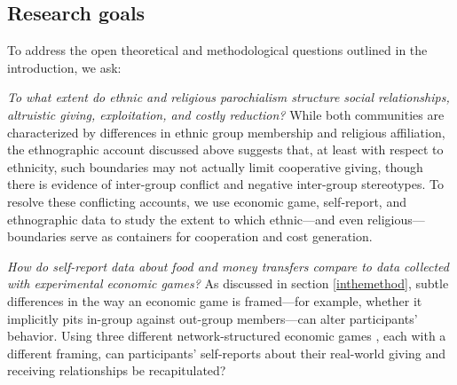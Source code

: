 \documentclass[bibauthoryear]{aa}
\begin{document}
\subsection{Research goals}
To address the open theoretical and methodological questions outlined in the introduction, we ask:\\
\indent
\begin{enumerate*}[label={Q(\arabic*)},font={\color{blue!50!black}\bfseries}]
\item \label{q1} \emph{To what extent do ethnic and religious parochialism structure social relationships, altruistic giving, exploitation, and costly reduction?} While both communities are characterized by differences in ethnic group membership and religious affiliation, the ethnographic account discussed above \citep{Cay73} suggests that, at least with respect to ethnicity, such boundaries may not actually limit cooperative giving, though there is evidence of inter-group conflict and  negative inter-group stereotypes. To resolve these conflicting accounts, we use economic game, self-report, and ethnographic data to study the extent to which ethnic---and even religious---boundaries serve as containers for cooperation and cost generation.
\\
\indent

\item \label{q3} \emph{How do self-report data about food and money transfers compare to data collected with experimental economic games?} As discussed in section \ref{inthemethod}, subtle differences in the way an economic game is framed---for example, whether it implicitly pits in-group against out-group members---can alter participants' behavior. Using three different network-structured economic  games \citep{gervais2017rich}, each with a different framing, can participants' self-reports about their real-world giving and receiving relationships be recapitulated?\\
\indent



\end{enumerate*}
\end{document}
